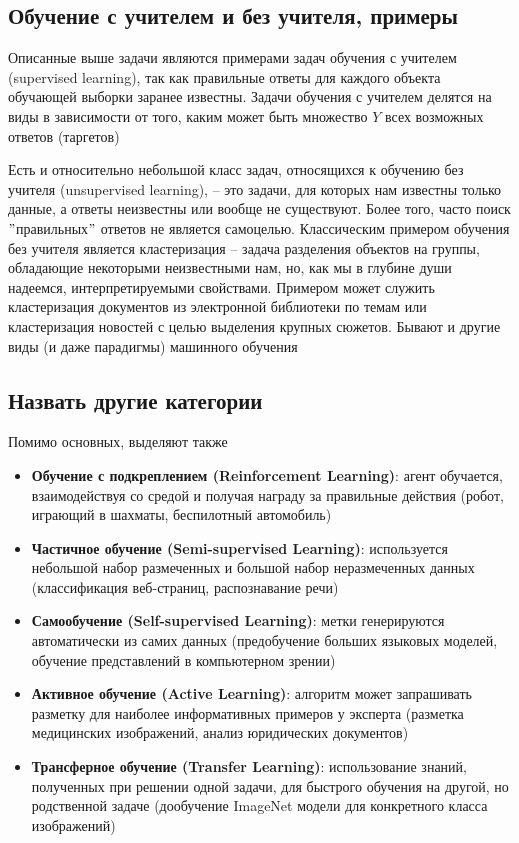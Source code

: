 \subsection{Обучение с учителем и без учителя, примеры}

Описанные выше задачи являются примерами задач обучения с учителем (supervised learning), так как правильные ответы
для каждого объекта обучающей выборки заранее известны.
Задачи обучения с учителем делятся на виды в зависимости от того, каким может быть множество $Y$ всех возможных
ответов (таргетов)

Есть и относительно небольшой класс задач, относящихся к обучению без учителя (unsupervised learning), -- это
задачи, для которых нам известны только данные, а ответы неизвестны или вообще не существуют.
Более того, часто поиск \("\)правильных\("\) ответов не является самоцелью.
Классическим примером обучения без учителя является кластеризация -- задача разделения объектов на группы,
обладающие некоторыми неизвестными нам, но, как мы в глубине души надеемся, интерпретируемыми свойствами.
Примером может служить кластеризация документов из электронной библиотеки по темам или кластеризация новостей с
целью выделения крупных сюжетов.
Бывают и другие виды (и даже парадигмы) машинного обучения

\subsection{Назвать другие категории}

Помимо основных, выделяют также
\begin{itemize}
    \item \textbf{Обучение с подкреплением (Reinforcement Learning)}: агент обучается, взаимодействуя со средой
    и получая награду за правильные действия (робот, играющий в шахматы, беспилотный автомобиль)
    \item \textbf{Частичное обучение (Semi-supervised Learning)}: используется небольшой набор размеченных и
    большой набор неразмеченных данных (классификация веб-страниц, распознавание речи)
    \item \textbf{Самообучение (Self-supervised Learning)}: метки генерируются автоматически из самих данных
    (предобучение больших языковых моделей, обучение представлений в компьютерном зрении)
    \item \textbf{Активное обучение (Active Learning)}: алгоритм может запрашивать разметку для наиболее
    информативных примеров у эксперта (разметка медицинских изображений, анализ юридических документов)
    \item \textbf{Трансферное обучение (Transfer Learning)}: использование знаний, полученных при решении одной
    задачи, для быстрого обучения на другой, но родственной задаче (дообучение ImageNet модели для конкретного
    класса изображений)
\end{itemize}

